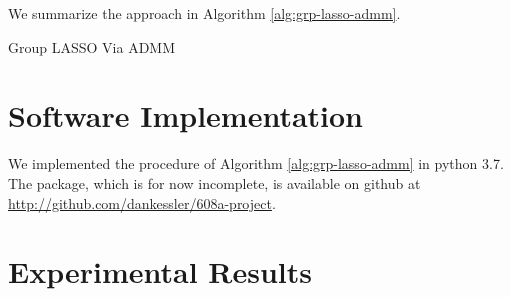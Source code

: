 \documentclass{article}
\begin{document}
We summarize the approach in Algorithm \ref{alg:grp-lasso-admm}.
\begin{algorithm}
    \caption{Group LASSO Via ADMM}
    \label{alg:grp-lasso-admm}
    \begin{algorithmic}[1]
      
  \end{algorithmic}
\end{algorithm}

\section{Software Implementation}
\label{sec:implementation}
We implemented the procedure of Algorithm \ref{alg:grp-lasso-admm} in python 3.7.
The package, which is for now incomplete, is available on github at \url{http://github.com/dankessler/608a-project}.

\section{Experimental Results}
\label{sec:experimental-results}


\printbibliography
\end{document}
